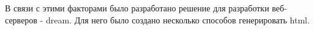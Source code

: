 В связи с этими факторами было разработано решение для разработки веб-серверов - dream. Для него было создано несколько способов генерировать html. 





